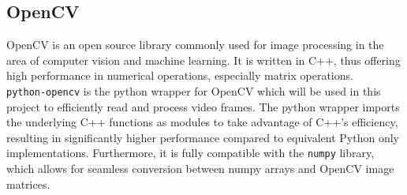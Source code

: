 \subsection{OpenCV}\label{subsec:2_openCV}
OpenCV is an open source library commonly used for image processing in the 
area of computer vision and machine learning.
It is written in C++, thus offering high performance in numerical operations,
especially matrix operations.\\
\texttt{python-opencv} is the python wrapper for OpenCV which will be used in
this project to efficiently read and process video frames.
The python wrapper imports the underlying C++ functions as modules to take 
advantage of C++'s efficiency, resulting in significantly higher performance
compared to equivalent Python only implementations.
Furthermore, it is fully compatible with the \texttt{numpy} library, which 
allows for seamless conversion between numpy arrays and OpenCV image matrices.

